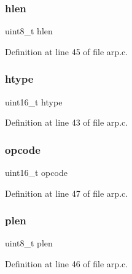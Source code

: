 \subsubsection{\texorpdfstring{hlen}{hlen}}
{\footnotesize\ttfamily uint8\+\_\+t hlen}



Definition at line 45 of file arp.\+c.

\hypertarget{struct__arp__hdr_aaf87c38602b614bc7896cf7a5a90d372}{}\label{struct__arp__hdr_aaf87c38602b614bc7896cf7a5a90d372} 
\subsubsection{\texorpdfstring{htype}{htype}}
{\footnotesize\ttfamily uint16\+\_\+t htype}



Definition at line 43 of file arp.\+c.

\hypertarget{struct__arp__hdr_aeb39438c0aa5ad494c96060b00351545}{}\label{struct__arp__hdr_aeb39438c0aa5ad494c96060b00351545} 
\subsubsection{\texorpdfstring{opcode}{opcode}}
{\footnotesize\ttfamily uint16\+\_\+t opcode}



Definition at line 47 of file arp.\+c.

\hypertarget{struct__arp__hdr_ae414f6c2299d9cf0eff8aa8e81f538d8}{}\label{struct__arp__hdr_ae414f6c2299d9cf0eff8aa8e81f538d8} 
\subsubsection{\texorpdfstring{plen}{plen}}
{\footnotesize\ttfamily uint8\+\_\+t plen}



Definition at line 46 of file arp.\+c.

\hypertarget{struct__arp__hdr_ab4891e9b77eb26f33d21cfde982564cb}{}\label{struct__arp__hdr_ab4891e9b77eb26f33d21cfde982564cb} 
